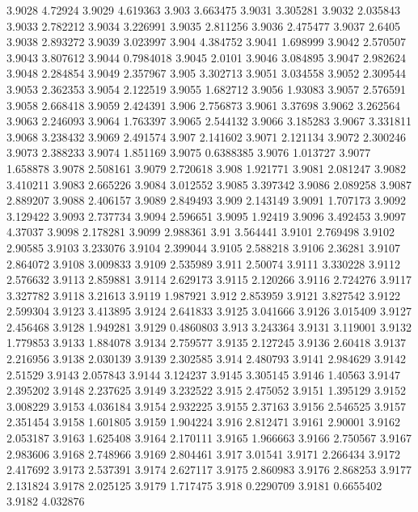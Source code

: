 3.9028  4.72924
3.9029  4.619363
3.903  3.663475
3.9031  3.305281
3.9032  2.035843
3.9033  2.782212
3.9034  3.226991
3.9035  2.811256
3.9036  2.475477
3.9037  2.6405
3.9038  2.893272
3.9039  3.023997
3.904  4.384752
3.9041  1.698999
3.9042  2.570507
3.9043  3.807612
3.9044  0.7984018
3.9045  2.0101
3.9046  3.084895
3.9047  2.982624
3.9048  2.284854
3.9049  2.357967
3.905  3.302713
3.9051  3.034558
3.9052  2.309544
3.9053  2.362353
3.9054  2.122519
3.9055  1.682712
3.9056  1.93083
3.9057  2.576591
3.9058  2.668418
3.9059  2.424391
3.906  2.756873
3.9061  3.37698
3.9062  3.262564
3.9063  2.246093
3.9064  1.763397
3.9065  2.544132
3.9066  3.185283
3.9067  3.331811
3.9068  3.238432
3.9069  2.491574
3.907  2.141602
3.9071  2.121134
3.9072  2.300246
3.9073  2.388233
3.9074  1.851169
3.9075  0.6388385
3.9076  1.013727
3.9077  1.658878
3.9078  2.508161
3.9079  2.720618
3.908  1.921771
3.9081  2.081247
3.9082  3.410211
3.9083  2.665226
3.9084  3.012552
3.9085  3.397342
3.9086  2.089258
3.9087  2.889207
3.9088  2.406157
3.9089  2.849493
3.909  2.143149
3.9091  1.707173
3.9092  3.129422
3.9093  2.737734
3.9094  2.596651
3.9095  1.92419
3.9096  3.492453
3.9097  4.37037
3.9098  2.178281
3.9099  2.988361
3.91  3.564441
3.9101  2.769498
3.9102  2.90585
3.9103  3.233076
3.9104  2.399044
3.9105  2.588218
3.9106  2.36281
3.9107  2.864072
3.9108  3.009833
3.9109  2.535989
3.911  2.50074
3.9111  3.330228
3.9112  2.576632
3.9113  2.859881
3.9114  2.629173
3.9115  2.120266
3.9116  2.724276
3.9117  3.327782
3.9118  3.21613
3.9119  1.987921
3.912  2.853959
3.9121  3.827542
3.9122  2.599304
3.9123  3.413895
3.9124  2.641833
3.9125  3.041666
3.9126  3.015409
3.9127  2.456468
3.9128  1.949281
3.9129  0.4860803
3.913  3.243364
3.9131  3.119001
3.9132  1.779853
3.9133  1.884078
3.9134  2.759577
3.9135  2.127245
3.9136  2.60418
3.9137  2.216956
3.9138  2.030139
3.9139  2.302585
3.914  2.480793
3.9141  2.984629
3.9142  2.51529
3.9143  2.057843
3.9144  3.124237
3.9145  3.305145
3.9146  1.40563
3.9147  2.395202
3.9148  2.237625
3.9149  3.232522
3.915  2.475052
3.9151  1.395129
3.9152  3.008229
3.9153  4.036184
3.9154  2.932225
3.9155  2.37163
3.9156  2.546525
3.9157  2.351454
3.9158  1.601805
3.9159  1.904224
3.916  2.812471
3.9161  2.90001
3.9162  2.053187
3.9163  1.625408
3.9164  2.170111
3.9165  1.966663
3.9166  2.750567
3.9167  2.983606
3.9168  2.748966
3.9169  2.804461
3.917  3.01541
3.9171  2.266434
3.9172  2.417692
3.9173  2.537391
3.9174  2.627117
3.9175  2.860983
3.9176  2.868253
3.9177  2.131824
3.9178  2.025125
3.9179  1.717475
3.918  0.2290709
3.9181  0.6655402
3.9182  4.032876
